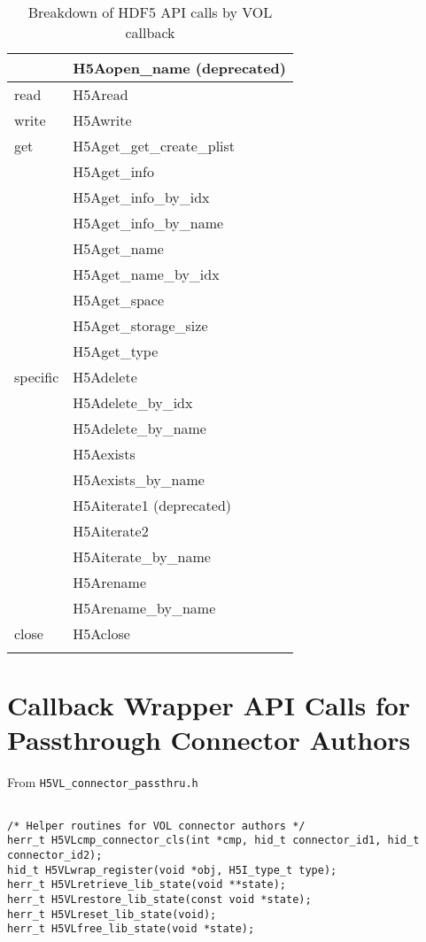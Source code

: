 \begin{appendices}
\begin{longtable}{ |l|>{\raggedright\arraybackslash}l| }
         & H5Aopen\_name (deprecated) \\
    \hline
    read & H5Aread \\
    \hline
    write & H5Awrite \\
    \hline
    get & H5Aget\_get\_create\_plist \\
        & H5Aget\_info \\
        & H5Aget\_info\_by\_idx \\
        & H5Aget\_info\_by\_name \\
        & H5Aget\_name \\
        & H5Aget\_name\_by\_idx \\
        & H5Aget\_space \\
        & H5Aget\_storage\_size \\
        & H5Aget\_type \\
    \hline
    specific & H5Adelete \\
             & H5Adelete\_by\_idx \\
             & H5Adelete\_by\_name \\
             & H5Aexists \\
             & H5Aexists\_by\_name \\
             & H5Aiterate1 (deprecated) \\
             & H5Aiterate2 \\
             & H5Aiterate\_by\_name \\
             & H5Arename \\
             & H5Arename\_by\_name \\
    \hline
    close & H5Aclose \\
    \hline
\caption{Breakdown of HDF5 API calls by VOL callback}
\end{longtable}

\pagebreak

\section{Callback Wrapper API Calls for Passthrough Connector Authors}
\label{sec:B}

From {\tt H5VL\_connector\_passthru.h}

\begin{lstlisting}

/* Helper routines for VOL connector authors */                                  
herr_t H5VLcmp_connector_cls(int *cmp, hid_t connector_id1, hid_t connector_id2);
hid_t H5VLwrap_register(void *obj, H5I_type_t type);                      
herr_t H5VLretrieve_lib_state(void **state);                              
herr_t H5VLrestore_lib_state(const void *state);                          
herr_t H5VLreset_lib_state(void);                                         
herr_t H5VLfree_lib_state(void *state);                                   
                                                                                 

\end{lstlisting}
\end{appendices}
